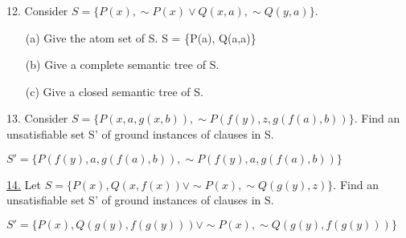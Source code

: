 12. Consider $ S = \{P(x), \sim P(x) \vee Q(x,a), \sim Q(y,a)\} $.
\begin{itemize}
 \item[(a)] Give the atom set of S. \newline
S = \{P(a), Q(a,a)\}
 \item[(b)] Give a complete semantic tree of S. \newline
{}
 \item[(c)] Give a closed semantic tree of S. \newline
{}
\end{itemize}

13. Consider $ S = \{P(x,a,g(x,b)), \sim P(f(y),z,g(f(a),b))\} $. Find an unsatisfiable set S' of ground instances of clauses in S.

$ S' = \{ P(f(y),a,g(f(a),b)), \sim P(f(y),a,g(f(a),b)) \} $

\underline{14.} Let $ S = \{P(x),Q(x,f(x)) \vee \sim P(x), \sim Q(g(y),z)\} $. Find an unsatisfiable set S' of ground instances of clauses in S.

$ S' = \{ P(x), Q(g(y),f(g(y)))\vee \sim P(x), \sim Q(g(y),f(g(y)))\} $